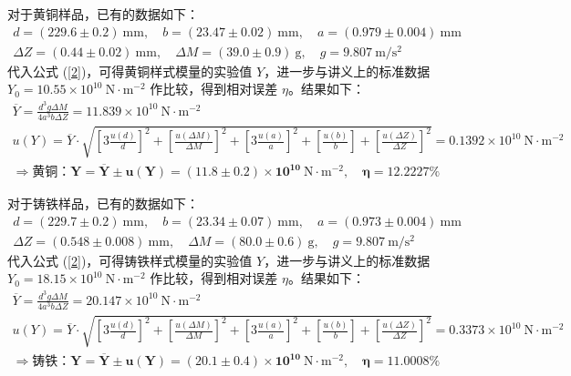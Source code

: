 \documentclass[UTF8]{article}
\theoremstyle{MyLineTheoremStyle} %
\theoremstyle{MyBlockTheoremStyle} %
\theoremstyle{MySubsubsectionStyle} %
\begin{document}
对于黄铜样品，已有的数据如下：
\begin{gather}
    d = (229.6 \pm 0.2) \ \mathrm{mm},\quad
    b = (23.47 \pm 0.02) \ \mathrm{mm},\quad
    a = (0.979 \pm 0.004) \ \mathrm{mm}\\ 
    \Delta Z = (0.44 \pm 0.02) \ \mathrm{mm},\quad 
    \Delta M = (39.0 \pm 0.9) \ \mathrm{g},\quad
    g = 9.807 \ \mathrm{m/s^2}
\end{gather}
代入公式 (\ref{2})，可得黄铜样式模量的实验值 $Y$，进一步与讲义上的标准数据 $Y_0 = 10.55  \times 10^{10} \ \mathrm{N\cdot m^{-2}} $ 作比较，得到相对误差 $\eta$。结果如下：
\begin{gather}
    \overline{Y} = \frac{d^3 g \Delta M}{4a^3b\Delta Z} = 11.839 \times 10^{10} \ \mathrm{N\cdot m^{-2}} \\ 
    u(Y) = \overline{Y} \cdot \sqrt{
    \left[ 3 \frac{u(d)}{d} \right]^2 + 
    \left[\frac{u(\Delta M)}{\Delta M}\right]^2 + 
    \left[ 3 \frac{u(a)}{a} \right]^2 + 
    \left[ \frac{u(b)}{b} \right] + 
    \left[ \frac{u(\Delta Z)}{\Delta Z} \right]^2
    } =  0.1392 \times 10^{10} \ \mathrm{N\cdot m^{-2}} \\
    \Longrightarrow \text{黄铜：}  \boldsymbol{
        Y = \overline{Y} \pm u(Y) = (11.8 \pm 0.2) \times 10^{10} \ \mathrm{N\cdot m^{-2}}
        ,\quad 
        \eta = 12.2227 \%
    }
\end{gather}

对于铸铁样品，已有的数据如下：
\begin{gather}
    d = (229.7 \pm 0.2) \ \mathrm{mm},\quad
    b = (23.34 \pm 0.07) \ \mathrm{mm},\quad
    a = (0.973 \pm 0.004) \ \mathrm{mm}\\ 
    \Delta Z = (0.548 \pm 0.008) \ \mathrm{mm},\quad 
    \Delta M = (80.0 \pm 0.6) \ \mathrm{g},\quad
    g = 9.807 \ \mathrm{m/s^2}
\end{gather}
代入公式 (\ref{2})，可得铸铁样式模量的实验值 $Y$，进一步与讲义上的标准数据 $Y_0 = 18.15  \times 10^{10} \ \mathrm{N\cdot m^{-2}} $ 作比较，得到相对误差 $\eta$。结果如下：
\begin{gather}
    \overline{Y} = \frac{d^3 g \Delta M}{4a^3b\Delta Z} = 20.147 \times 10^{10} \ \mathrm{N\cdot m^{-2}} \\ 
    u(Y) = \overline{Y} \cdot \sqrt{
    \left[ 3 \frac{u(d)}{d} \right]^2 + 
    \left[\frac{u(\Delta M)}{\Delta M}\right]^2 + 
    \left[ 3 \frac{u(a)}{a} \right]^2 + 
    \left[ \frac{u(b)}{b} \right] + 
    \left[ \frac{u(\Delta Z)}{\Delta Z} \right]^2
    } =  0.3373 \times 10^{10} \ \mathrm{N\cdot m^{-2}} \\
    \Longrightarrow \text{铸铁：} \boldsymbol{
        Y = \overline{Y} \pm u(Y) = (20.1 \pm 0.4) \times 10^{10} \ \mathrm{N\cdot m^{-2}}
        ,\quad 
        \eta = 11.0008 \%
    }
\end{gather}
\end{document}

